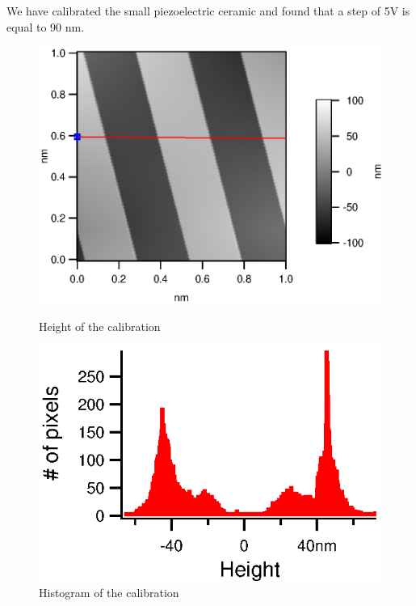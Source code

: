 We have calibrated the small piezoelectric ceramic and found that a step of 5V is equal to 90 nm.
\begin{figure}[!ht]
\begin{minipage}[b]{0.45\linewidth}
\centering
\includegraphics[width=\textwidth]{images/Calib1vPP_HeightMap.eps}
\caption{Height of the calibration}
\label{fig:figure1}
\end{minipage}
\hspace{0.5cm}
\begin{minipage}[b]{0.45\linewidth}
\centering
\includegraphics[width=\textwidth]{images/Calib1VppHisto.eps}
\caption{Histogram of the calibration}
\label{fig:figure2}
\end{minipage}
\end{figure}

